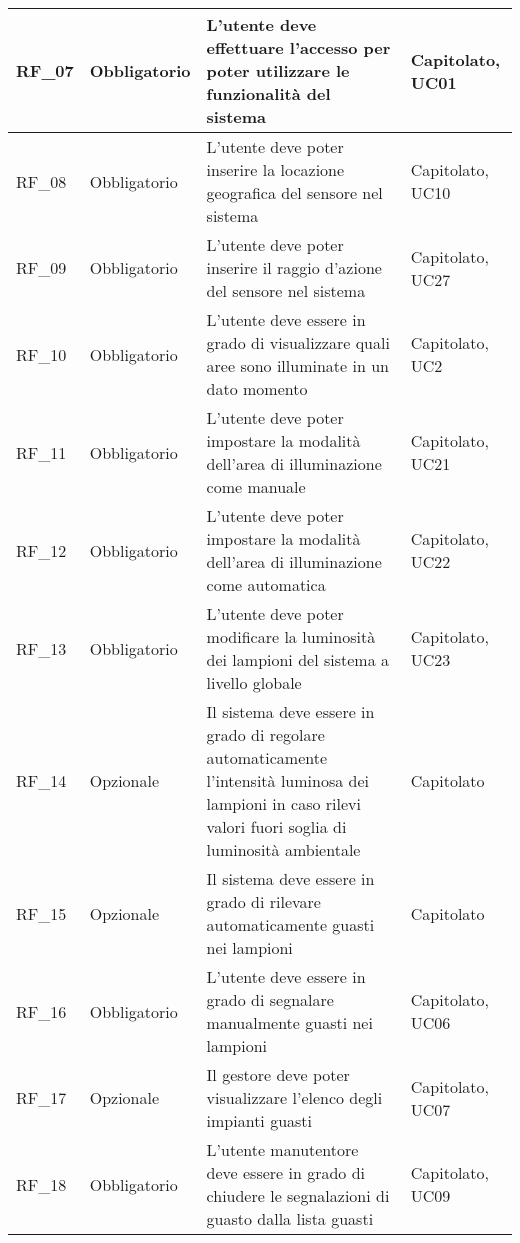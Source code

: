 \begin{center}
\begin{xltabular}{\linewidth}{|l|l|X|l|}
        \hline
        RF\_07 & Obbligatorio & L'utente deve effettuare l'accesso per poter utilizzare le funzionalità del sistema & Capitolato, UC01\\

        \hline
        RF\_08 & Obbligatorio & L'utente deve poter inserire la locazione geografica del sensore nel sistema & Capitolato, UC10\\

        \hline
        RF\_09 & Obbligatorio & L'utente deve poter inserire il raggio d'azione del sensore nel sistema & Capitolato, UC27\\

        \hline
        RF\_10 & Obbligatorio & L'utente deve essere in grado di visualizzare quali aree sono illuminate in un dato momento & Capitolato, UC2\\

        \hline
        RF\_11 & Obbligatorio & L'utente deve poter impostare la modalità dell'area di illuminazione come manuale & Capitolato, UC21\\

        \hline
        RF\_12 & Obbligatorio & L'utente deve poter impostare la modalità dell'area di illuminazione come automatica & Capitolato, UC22\\

        \hline
        RF\_13 & Obbligatorio & L'utente deve poter modificare la luminosità dei lampioni del sistema a livello globale & Capitolato, UC23\\

        \hline
        RF\_14 & Opzionale & Il sistema deve essere in grado di regolare automaticamente l'intensità luminosa dei lampioni in caso rilevi valori fuori soglia di luminosità ambientale & Capitolato\\

        \hline
        RF\_15 & Opzionale & Il sistema deve essere in grado di rilevare automaticamente guasti nei lampioni & Capitolato \\

        \hline
        RF\_16 & Obbligatorio & L'utente deve essere in grado di segnalare manualmente guasti nei lampioni & Capitolato, UC06 \\

        \hline
        RF\_17 & Opzionale & Il gestore deve poter visualizzare l'elenco degli impianti guasti & Capitolato, UC07 \\

        \hline
        RF\_18 & Obbligatorio & L'utente manutentore deve essere in grado di chiudere le segnalazioni di guasto dalla lista guasti & Capitolato, UC09 \\


\end{xltabular}
\end{center}
